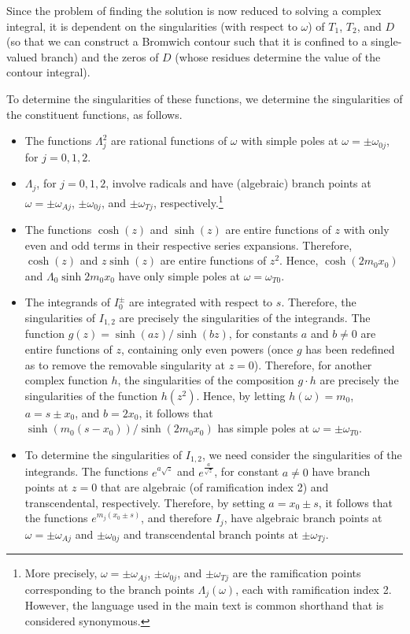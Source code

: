 \documentclass[12pt]{article}
\begin{document}
Since the problem of finding the solution is now reduced to solving a complex integral, it is dependent on the singularities (with respect to $\omega$) of $T_1$, $T_2$, and $D$ (so that we can construct a Bromwich contour such that it is confined to a single-valued branch) and the zeros of $D$ (whose residues determine the value of the contour integral).

To determine the singularities of these functions, we determine the singularities of the constituent functions, as follows.
\begin{itemize}
	\item The functions $\Lambda_j^2$ are rational functions of $\omega$ with simple poles at $\omega = \pm \omega_{0j}$, for $j = 0, 1, 2$.
	
	\item $\Lambda_j$, for $j = 0, 1, 2$, involve radicals and have (algebraic) branch points at $\omega = \pm \omega_{Aj}$, $\pm \omega_{0j}$, and $\pm \omega_{Tj}$, respectively.\footnote{More precisely, $\omega = \pm \omega_{Aj}$, $\pm \omega_{0j}$, and $\pm \omega_{Tj}$ are the ramification points corresponding to the branch points $\Lambda_j(\omega)$, each with ramification index 2. However, the language used in the main text is common shorthand that is considered synonymous.}
	
	\item The functions $\cosh(z)$ and $\sinh(z)$ are entire functions of $z$ with only even and odd terms in their respective series expansions. Therefore, $\cosh(z)$ and $z\sinh(z)$ are entire functions of $z^2$. Hence, $\cosh(2m_0x_0)$ and $\Lambda_0\sinh{2m_0x_0}$ have only simple poles at $\omega = \omega_{T0}$.
	
	\item The integrands of $I_0^\pm$ are integrated with respect to $s$. Therefore, the singularities of $I_{1,2}$ are precisely the singularities of the integrands. The function $g(z) = \sinh(az) / \sinh(bz)$, for constants $a$ and $b \neq 0$ are entire functions of $z$, containing only even powers (once $g$ has been redefined as to remove the removable singularity at $z = 0$). Therefore, for another complex function $h$, the singularities of the composition $g \cdot h$ are precisely the singularities of the function $h(z^2)$. Hence, by letting $h(\omega) = m_0$, $a = s \pm x_0$, and $b = 2x_0$, it follows that $\sinh(m_0(s - x_0)) / \sinh(2m_0x_0)$ has simple poles at $\omega = \pm \omega_{T0}$.
	
	\item To determine the singularities of $I_{1,2}$, we need consider the singularities of the integrands. The functions $e^{a\sqrt{z}}$ and $e^{\frac{a}{\sqrt{z}}}$, for constant $a \neq 0$ have branch points at $z = 0$ that are algebraic (of ramification index 2) and transcendental, respectively. Therefore, by setting $a = x_0 \pm s$, it follows that the functions $e^{m_j(x_0 \pm s)}$, and therefore $I_j$, have algebraic branch points at $\omega = \pm \omega_{Aj}$ and $\pm \omega_{0j}$ and transcendental branch points at $\pm \omega_{Tj}$.
\end{itemize}
\end{document}

